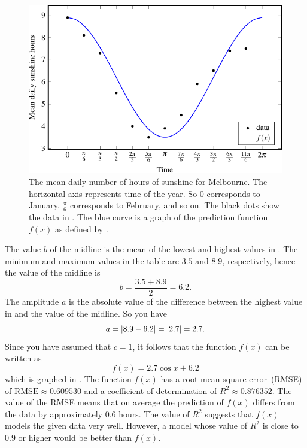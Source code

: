 \documentclass[a4paper,oneside,12pt]{article}
\begin{document}
\begin{problem}
{\begin{solution}
\begin{figure}[!htbp]
\centering
\includegraphics[scale=1.1]{image/13/mean-daily-sunshine.pdf}
\caption{%
  The mean daily number of hours of sunshine for Melbourne.  The
  horizontal axis represents time of the year.  So $0$ corresponds to
  January, $\frac{\pi}{6}$ corresponds to February, and so on.  The
  black dots show the data in
  .  The blue curve is a
  graph of the prediction function $f(x)$ as defined by
  .
}
\label{fig:trigonometric:mean_daily_sunshine}
\end{figure}

The value $b$ of the midline is the mean of the lowest and highest
values in .  The minimum
and maximum values in the table are $3.5$ and $8.9$, respectively,
hence the value of the midline is
\[
b
=
\frac{3.5 + 8.9}{2}
=
6.2.
\]
The amplitude $a$ is the absolute value of the difference between the
highest value in  and the
value of the midline.  So you have
\[
a
=
\lvert8.9 - 6.2\rvert
=
\lvert2.7\rvert
=
2.7.
\]
Since you have assumed that $c = 1$, it follows that the function
$f(x)$ can be written as
\begin{equation}
\label{eqn:trigonometric:mean_daily_sunshine}
f(x)
=
2.7 \cos x + 6.2
\end{equation}
which is graphed in .
The function $f(x)$ has a root mean square error~(RMSE) of
$\text{RMSE} \approx 0.609530$ and a coefficient of determination of
$R^2 \approx 0.876352$.  The value of the RMSE means that on average
the prediction of $f(x)$ differs from the data by approximately $0.6$
hours.  The value of $R^2$ suggests that $f(x)$ models the given data
very well.  However, a model whose value of $R^2$ is close to $0.9$ or
higher would be better than $f(x)$.


\end{solution}}
\end{problem}
\end{document}
